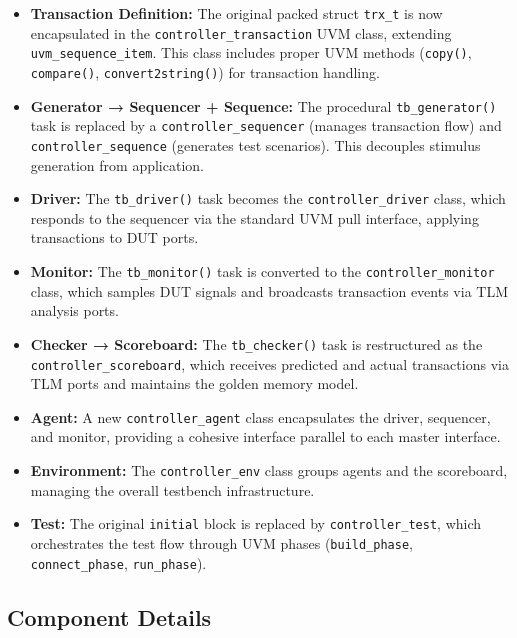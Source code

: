 \documentclass{article}
\begin{document}
\begin{itemize}
    \item \textbf{Transaction Definition:} The original packed struct \texttt{trx\_t} is now encapsulated in the \texttt{controller\_transaction} UVM class, extending \texttt{uvm\_sequence\_item}. This class includes proper UVM methods (\texttt{copy()}, \texttt{compare()}, \texttt{convert2string()}) for transaction handling.
    
    \item \textbf{Generator → Sequencer + Sequence:} The procedural \texttt{tb\_generator()} task is replaced by a \texttt{controller\_sequencer} (manages transaction flow) and \texttt{controller\_sequence} (generates test scenarios). This decouples stimulus generation from application.
    
    \item \textbf{Driver:} The \texttt{tb\_driver()} task becomes the \texttt{controller\_driver} class, which responds to the sequencer via the standard UVM pull interface, applying transactions to DUT ports.
    
    \item \textbf{Monitor:} The \texttt{tb\_monitor()} task is converted to the \texttt{controller\_monitor} class, which samples DUT signals and broadcasts transaction events via TLM analysis ports.
    
    \item \textbf{Checker → Scoreboard:} The \texttt{tb\_checker()} task is restructured as the \texttt{controller\_scoreboard}, which receives predicted and actual transactions via TLM ports and maintains the golden memory model.
    
    \item \textbf{Agent:} A new \texttt{controller\_agent} class encapsulates the driver, sequencer, and monitor, providing a cohesive interface parallel to each master interface.
    
    \item \textbf{Environment:} The \texttt{controller\_env} class groups agents and the scoreboard, managing the overall testbench infrastructure.
    
    \item \textbf{Test:} The original \texttt{initial} block is replaced by \texttt{controller\_test}, which orchestrates the test flow through UVM phases (\texttt{build\_phase}, \texttt{connect\_phase}, \texttt{run\_phase}).
\end{itemize}

\subsection{Component Details}
\end{document}
